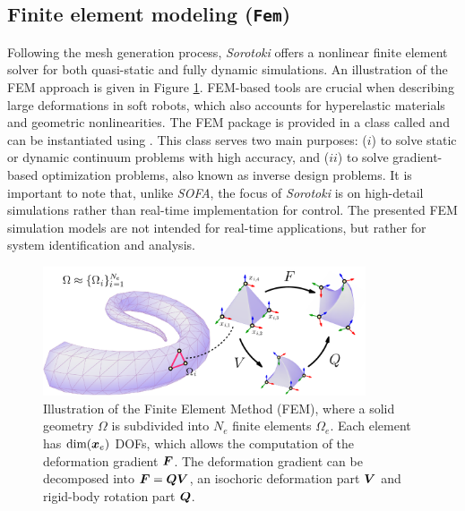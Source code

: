\subsection{Finite element modeling (\texttt{Fem})}
\label{sec:C5:fem}
Following the mesh generation process, \textit{Sorotoki} offers a nonlinear finite element solver for both quasi-static and fully dynamic simulations. An illustration of the FEM approach is given in Figure \ref{fig:C5:illustration_FEM}. FEM-based tools are crucial when describing large deformations in soft robots, which also accounts for hyperelastic materials and geometric nonlinearities. The FEM package is provided in a class called  and can be instantiated using . This class serves two main purposes: ($i$) to solve static or dynamic continuum problems with high accuracy, and ($ii$) to solve gradient-based optimization problems, also known as inverse design problems. It is important to note that, unlike \textit{SOFA}, the focus of \textit{Sorotoki} is on high-detail simulations rather than real-time implementation for control. The presented FEM simulation models are not intended for real-time applications, but rather for system identification and analysis.

\begin{figure}
\centering
\includegraphics[width=0.85\textwidth]{./pdf/thesis-figure-6-5.pdf}
\caption{Illustration of the Finite Element Method (FEM), where a solid geometry $\Omega$ is subdivided into $N_e$ finite elements $\Omega_e$. Each element has $\text{dim}({\boldsymbol{x}}_e)$ DOFs, which allows the computation of the deformation gradient ${\boldsymbol{F}}$. The deformation gradient can be decomposed into ${\boldsymbol{F}} = {\boldsymbol{Q}}{\boldsymbol{V}}$, an isochoric deformation part ${\boldsymbol{V}}$ and rigid-body rotation part ${\boldsymbol{Q}}$. }    
\label{fig:C5:illustration_FEM}
\end{figure}

